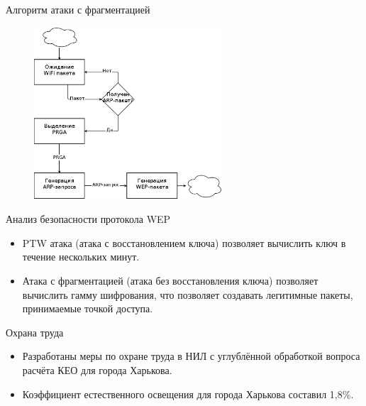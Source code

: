 \documentclass[12pt]{beamer}
\begin{document}
\begin{frame}{Алгоритм атаки с фрагментацией}

    \begin{figure}
        \includegraphics[width=7cm]{graphics/fragment_program_algo.eps}
    \end{figure}

\end{frame} 


\begin{frame}{Анализ безопасности протокола WEP}

    \begin{itemize}

        \item PTW атака (атака с восстановлением ключа) позволяет вычислить ключ
        в течение нескольких минут.

        \item Атака с фрагментацией (атака без восстановления ключа) позволяет
        вычислить гамму шифрования, что позволяет создавать легитимные пакеты,
        принимаемые точкой доступа.

    \end{itemize}

\end{frame} 


\begin{frame}{Охрана труда}

    \begin{itemize}
        \item Разработаны меры по охране труда в НИЛ с углублённой обработкой вопроса расчёта КЕО для города Харькова.
        \item Коэффициент естественного освещения для города Харькова составил 1,8\%.
    \end{itemize}

\end{frame} 
\end{document}
